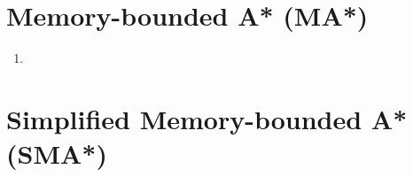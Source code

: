 \section{Memory-bounded A* (MA*) \cite{aci-1}} \label{Memory-bounded A* (MA*)}

\begin{enumerate}
    \item 
\end{enumerate}















\section{Simplified Memory-bounded A* (SMA*) \cite{aci-1}} \label{Simplified Memory-bounded A* (SMA*)}

